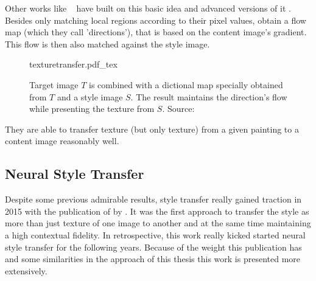 Other works like \citeauthor*{texturetransfer}~\cite{texturetransfer} have built on this basic idea and advanced versions of it \cite{fasttexturetransfer} \cite{texturetransfer}.
Besides only matching local regions according to their pixel values, \citeauthor*{texturetransfer} obtain a flow map (which they call 'directions'), that is based on the content image's gradient.
This flow is then also matched against the style image.
\begin{figure}
    \begin{tiny}
    \def\svgwidth{\textwidth}
    {texturetransfer.pdf_tex}
    \end{tiny}
    \caption{Target image $T$ is combined with a dictional map specially obtained from $T$ and a style image  $S$. The result maintains the direction's flow while presenting the texture from $S$. Source:~\cite{texturetransfer}}
\end{figure}
They are able to transfer texture (but only texture) from a given painting to a content image reasonably well.





\subsection{Neural Style Transfer}
Despite some previous admirable results\cite{texturetransfer}, style transfer really gained traction in 2015 with the publication of  by \citeauthor*{gatys}.
It was the first approach to transfer the style as more than just texture of one image to another and at the same time maintaining a high contextual fidelity.
In retrospective, this work really kicked started neural style transfer for the following years.
Because of the weight this publication has and some similarities in the approach of this thesis this work is presented more extensively.



